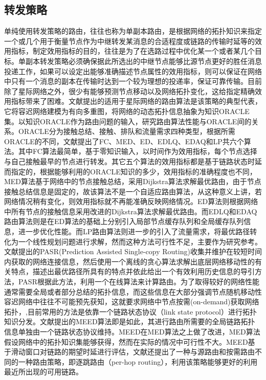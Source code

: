 \subsection{转发策略}

单纯使用转发策略的路由，往往也称为单副本路由，是根据网络的拓扑知识来指定一个或几个用于衡量节点作为中继转发某消息的合适程度或链路的传输时延等的效用指标，制定效用指标的目的，往往是为了在选路过程中优化某一个或者某几个目标。单副本转发策略必须确保据此所选出的中继节点能够比源节点更好的胜任消息投递工作，如果可以设定出能够准确描述节点属性的效用指标，则可以保证在网络中只有一个消息的副本在传输时达到一个较为理想的投递率，保证可靠传输。目前除了星际网络之外，很少有能够预测节点移动以及网络拓扑变化，这给指定精确效用指标带来了困难。文献提出的适用于星际网络的路由算法是该策略的典型代表，它将容迟网络建模为有向多重图，将网络的动态拓扑信息抽象为知识ORACLE集。以知识ORACLE作为路由问题的输入，研究路由算法性能与ORACLE间的关系。ORACLE分为接触总结、接触、排队和流量需求四种类型，根据所需ORACLE的不同，文献提出了FC、MED、ED、EDLQ、EDAQ和LP共六个算法。其中FC算法最简单，基于零知识输入，以时间作为效用指标，每个节点选择与自己接触最早的节点进行转发。其它五个算法的效用指标都是基于链路状态时延而指定的，根据能够利用的ORACLE知识的多少，效用指标的准确程度也不同，MED算法基于网络中的节点接触总结，采用Dijkstra算法求解最优路由，由于节点接触总结信息是固定的，故该算法不是一个自适应路由算法，从这种意义上讲，若网络情况稍有变化，则效用指标就不再能准确反映网络情况。ED算法则根据网络中所有节点的接触信息采用改进的Dijkstra算法求解最优路由。而EDLQ和EDAQ路由算法则是在ED算法的基础上分别引入局部节点缓存队列和全局缓存队列信息，进一步优化性能。而LP路由算法则进一步的引入了流量需求，将最优路径转化为一个线性规划问题进行求解，然而这种方法可行性不足，主要作为研究参考。文献提出的PASR(Prediction Assisted Single-copy Routing)收集并维护在较短时间内获取的网络连接信息，然后使用一个离线的贪心算法求解出底层网络移动性的有关特点，描述出最优路径所具有的特点并依此给出一个有效利用历史信息的导引方法，PASR根据此方法，利用一个在线算法来计算路由。为了取得较好的网络性能通常需要全局或者部分总结的拓扑信息，而这些信息在大部分强调节点随机移动性容迟网络中往往不可能预先获知，这就要求网络中节点按需(on-demand)获取网络拓扑，,目前常用的方法是依靠一个链路状态协议（link state protocol）进行拓扑知识分发。文献提出的MEED算法即是如此，其进行路由所需要的全局链路拓扑信息单独由一个链路状态协议维持。MEED在MED算法之上做了改进，MED算法假设网络中的拓扑知识集能够获得，然而在实际的情况中可行性不大。MEED基于滑动窗口对链路的期望时延进行评估，文献还提出了一种与源路由和按需路由不同的一种路由策略，即逐跳路由（per-hop routing），利用该策略能够更好的利用最近所出现的可用链路。

